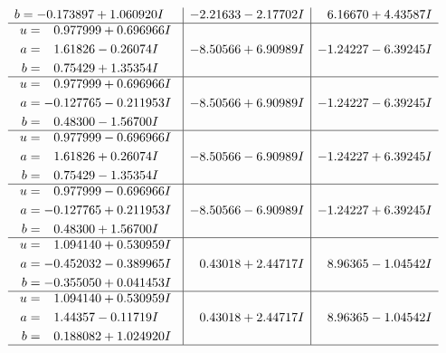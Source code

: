 \documentclass[1p]{elsarticle_modified}
\theoremstyle{definition}
\begin{document}
$$\begin{array}{c|c|c}
\begin{aligned}
b &= -0.173897 + 1.060920 I\end{aligned}
 & -2.21633 - 2.17702 I & \phantom{-}6.16670 + 4.43587 I \\ \hline\begin{aligned}
u &= \phantom{-}0.977999 + 0.696966 I \\
a &= \phantom{-}1.61826 - 0.26074 I \\
b &= \phantom{-}0.75429 + 1.35354 I\end{aligned}
 & -8.50566 + 6.90989 I & -1.24227 - 6.39245 I \\ \hline\begin{aligned}
u &= \phantom{-}0.977999 + 0.696966 I \\
a &= -0.127765 - 0.211953 I \\
b &= \phantom{-}0.48300 - 1.56700 I\end{aligned}
 & -8.50566 + 6.90989 I & -1.24227 - 6.39245 I \\ \hline\begin{aligned}
u &= \phantom{-}0.977999 - 0.696966 I \\
a &= \phantom{-}1.61826 + 0.26074 I \\
b &= \phantom{-}0.75429 - 1.35354 I\end{aligned}
 & -8.50566 - 6.90989 I & -1.24227 + 6.39245 I \\ \hline\begin{aligned}
u &= \phantom{-}0.977999 - 0.696966 I \\
a &= -0.127765 + 0.211953 I \\
b &= \phantom{-}0.48300 + 1.56700 I\end{aligned}
 & -8.50566 - 6.90989 I & -1.24227 + 6.39245 I \\ \hline\begin{aligned}
u &= \phantom{-}1.094140 + 0.530959 I \\
a &= -0.452032 - 0.389965 I \\
b &= -0.355050 + 0.041453 I\end{aligned}
 & \phantom{-}0.43018 + 2.44717 I & \phantom{-}8.96365 - 1.04542 I \\ \hline\begin{aligned}
u &= \phantom{-}1.094140 + 0.530959 I \\
a &= \phantom{-}1.44357 - 0.11719 I \\
b &= \phantom{-}0.188082 + 1.024920 I\end{aligned}
 & \phantom{-}0.43018 + 2.44717 I & \phantom{-}8.96365 - 1.04542 I\\
 \hline 

\end{array}$$
\end{document}

